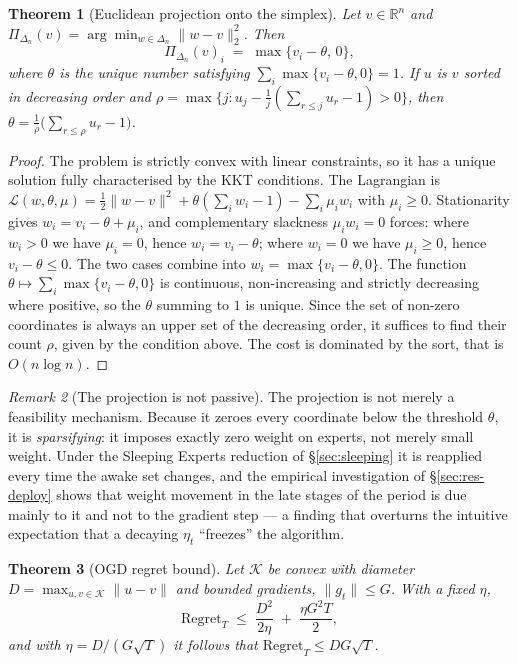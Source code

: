 \documentclass[12pt,a4paper,oneside]{report}
\renewcommand{\_}{\oldunderscore\allowbreak}
\theoremstyle{definition}
\theoremstyle{plain}
\newtheorem{theorem}{Theorem}[chapter]
\theoremstyle{remark}
\newtheorem{remark}[theorem]{Remark}
\begin{document}
\begin{theorem}[Euclidean projection onto the simplex]
\label{thm:projection}
Let $v \in \mathbb{R}^n$ and $\Pi_{\Delta_n}(v) = \arg\min_{w\in\Delta_n}\|w-v\|_2^2$. Then
\[
\Pi_{\Delta_n}(v)_i \;=\; \max\{v_i - \theta,\, 0\},
\]
where $\theta$ is the unique number satisfying $\sum_i \max\{v_i-\theta,0\} = 1$. If $u$ is $v$
sorted in decreasing order and
$\rho = \max\{j : u_j - \frac{1}{j}(\sum_{r\leq j} u_r - 1) > 0\}$, then
$\theta = \frac{1}{\rho}\big(\sum_{r\leq\rho} u_r - 1\big)$.
\end{theorem}

\begin{proof}
The problem is strictly convex with linear constraints, so it has a unique solution fully
characterised by the KKT conditions. The Lagrangian is
$\mathcal{L}(w,\theta,\mu) = \tfrac12\|w-v\|^2 + \theta(\sum_i w_i - 1) - \sum_i \mu_i w_i$
with $\mu_i \geq 0$. Stationarity gives $w_i = v_i - \theta + \mu_i$, and complementary
slackness $\mu_i w_i = 0$ forces: where $w_i>0$ we have $\mu_i=0$, hence $w_i = v_i-\theta$;
where $w_i=0$ we have $\mu_i \geq 0$, hence $v_i-\theta \leq 0$. The two cases combine into
$w_i = \max\{v_i-\theta,0\}$. The function $\theta \mapsto \sum_i \max\{v_i-\theta,0\}$ is
continuous, non-increasing and strictly decreasing where positive, so the $\theta$ summing to
$1$ is unique. Since the set of non-zero coordinates is always an upper set of the decreasing
order, it suffices to find their count $\rho$, given by the condition above. The cost is
dominated by the sort, that is $O(n\log n)$.
\end{proof}

\begin{remark}[The projection is not passive]
The projection is not merely a feasibility mechanism. Because it zeroes every coordinate below
the threshold $\theta$, it is \emph{sparsifying}: it imposes exactly zero weight on experts,
not merely small weight. Under the Sleeping Experts reduction of \S\ref{sec:sleeping} it is
reapplied every time the awake set changes, and the empirical investigation of
\S\ref{sec:res-deploy} shows that weight movement in the late stages of the period is due
mainly to it and not to the gradient step --- a finding that overturns the intuitive
expectation that a decaying $\eta_t$ ``freezes'' the algorithm.
\end{remark}

\begin{theorem}[OGD regret bound]
Let $\mathcal{K}$ be convex with diameter $D = \max_{u,v\in\mathcal{K}}\|u-v\|$ and bounded
gradients, $\|g_t\| \leq G$. With a fixed $\eta$,
\[
\mathrm{Regret}_T \;\leq\; \frac{D^2}{2\eta} \;+\; \frac{\eta G^2 T}{2},
\]
and with $\eta = D/(G\sqrt{T})$ it follows that $\mathrm{Regret}_T \leq D G \sqrt{T}$.
\end{theorem}
\end{document}
